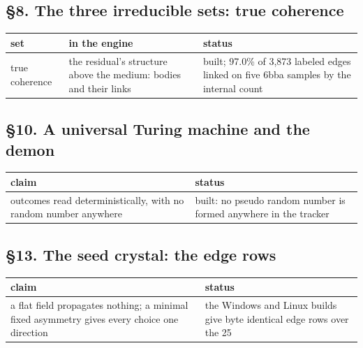 \subsection{\texorpdfstring{§8. The three irreducible sets: true coherence}{§8. The three irreducible sets: true coherence}}

{\small
\setlength{\tabcolsep}{6pt}
\begin{longtable}{>{\RaggedRight\arraybackslash}p{}>{\RaggedRight\arraybackslash}p{}>{\RaggedRight\arraybackslash}p{}}
\toprule
set & in the engine & status \\
\midrule
\endhead
true coherence & the residual's structure above the medium: bodies and their links & built; 97.0\% of 3,873 labeled edges linked on five 6bba samples by the internal count \\
\bottomrule
\end{longtable}
}

\subsection{\texorpdfstring{§10. A universal Turing machine and the demon}{§10. A universal Turing machine and the demon}}

{\small
\setlength{\tabcolsep}{6pt}
\begin{longtable}{>{\RaggedRight\arraybackslash}p{}>{\RaggedRight\arraybackslash}p{}}
\toprule
claim & status \\
\midrule
\endhead
outcomes read deterministically, with no random number anywhere & built: no pseudo random number is formed anywhere in the tracker \\
\bottomrule
\end{longtable}
}

\subsection{\texorpdfstring{§13. The seed crystal: the edge rows}{§13. The seed crystal: the edge rows}}

{\small
\setlength{\tabcolsep}{6pt}
\begin{longtable}{>{\RaggedRight\arraybackslash}p{}>{\RaggedRight\arraybackslash}p{}}
\toprule
claim & status \\
\midrule
\endhead
a flat field propagates nothing; a minimal fixed asymmetry gives every choice one direction & the Windows and Linux builds give byte identical edge rows over the 25 \\
\bottomrule
\end{longtable}
}

